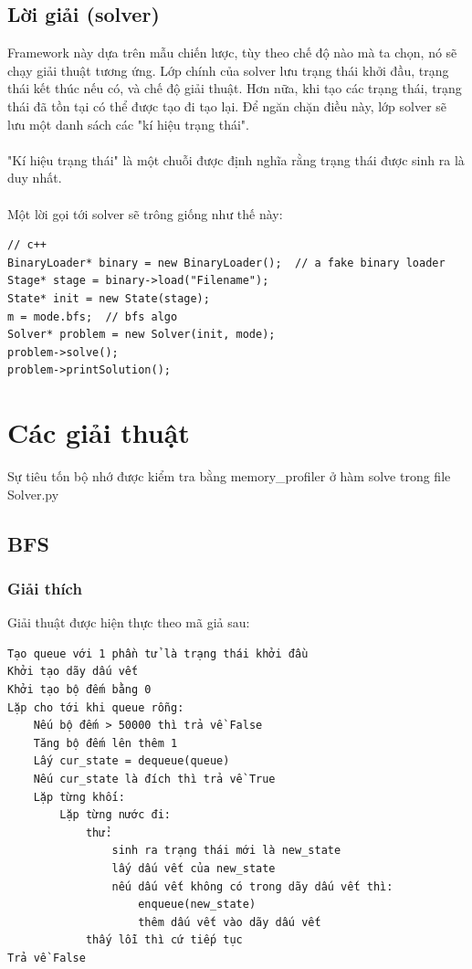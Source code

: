 \documentclass[a4paper, 11pt]{article}
\begin{document}
\subsection{Lời giải (solver)}
Framework này dựa trên mẫu chiến lược, tùy theo chế độ nào mà ta chọn, nó sẽ chạy giải thuật tương ứng.
Lớp chính của solver lưu trạng thái khởi đầu, trạng thái kết thúc nếu có, và chế độ giải thuật. Hơn nữa,
khi tạo các trạng thái, trạng thái đã tồn tại có thể được tạo đi tạo lại. Để ngăn chặn điều này, lớp solver
sẽ lưu một danh sách các "kí hiệu trạng thái".\\~\\
"Kí hiệu trạng thái" là một chuỗi được định nghĩa rằng trạng thái được sinh ra là duy nhất.\\~\\
Một lời gọi tới solver sẽ trông giống như thế này:
\begin{lstlisting}
// c++
BinaryLoader* binary = new BinaryLoader();  // a fake binary loader
Stage* stage = binary->load("Filename");
State* init = new State(stage);
m = mode.bfs;  // bfs algo
Solver* problem = new Solver(init, mode);
problem->solve();
problem->printSolution();
\end{lstlisting}
\section{Các giải thuật}
Sự tiêu tốn bộ nhớ được kiểm tra bằng memory\_profiler ở hàm solve trong file Solver.py
\subsection{BFS}
\subsubsection{Giải thích}
Giải thuật được hiện thực theo mã giả sau:
\begin{verbatim}
Tạo queue với 1 phần tử là trạng thái khởi đầu
Khởi tạo dãy dấu vết
Khởi tạo bộ đếm bằng 0
Lặp cho tới khi queue rỗng:
    Nếu bộ đếm > 50000 thì trả về False
    Tăng bộ đếm lên thêm 1
    Lấy cur_state = dequeue(queue)
    Nếu cur_state là đích thì trả về True
    Lặp từng khối:
        Lặp từng nước đi:
            thử:
                sinh ra trạng thái mới là new_state
                lấy dấu vết của new_state
                nếu dấu vết không có trong dãy dấu vết thì:
                    enqueue(new_state)
                    thêm dấu vết vào dãy dấu vết
            thấy lỗi thì cứ tiếp tục
Trả về False
\end{verbatim}
\end{document}
